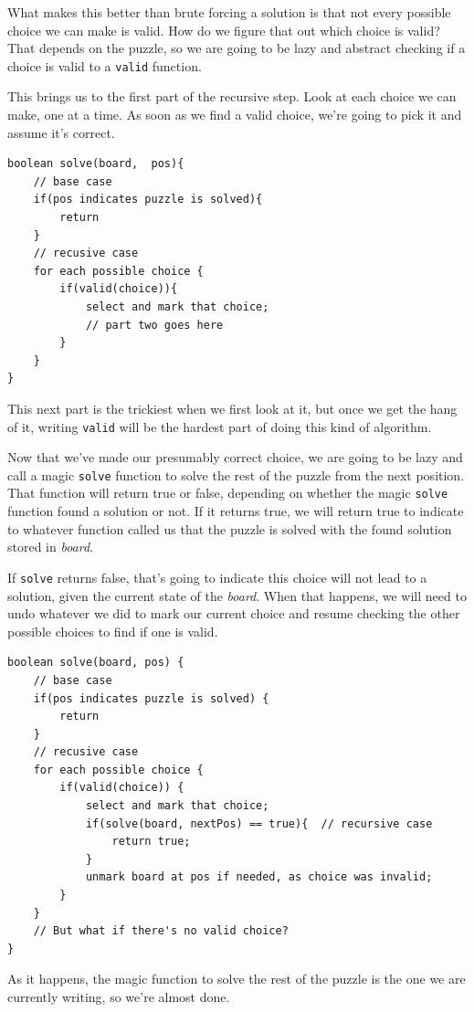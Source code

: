 What makes this better than brute forcing a solution is that not every possible choice we can make is valid. How do we figure that out which choice is valid?  That depends on the puzzle, so we are going to be lazy and abstract checking if a choice is valid to a \texttt{valid} function.

This brings us to the first part of the recursive step. Look at each choice we can make, one at a time.  As soon as we find a valid choice, we're going to pick it and assume it's correct.

\begin{verbatim}
boolean solve(board,  pos){
	// base case
	if(pos indicates puzzle is solved){
		return
	}
	// recusive case
	for each possible choice {
		if(valid(choice)){
			select and mark that choice;
			// part two goes here
		}
	}
}
\end{verbatim}


This next part is the trickiest when we first look at it, but once we get the hang of it, writing \texttt{valid} will be the hardest part of doing this kind of algorithm.

Now that we've made our presumably correct choice, we are going to be lazy and call a magic \texttt{solve} function to solve the rest of the puzzle from the next position.  That function will return true or false, depending on whether the magic \texttt{solve} function found a solution or not.  If it returns true, we will return true to indicate to whatever function called us that the puzzle is solved with the found solution stored in \textit{board}.

If \texttt{solve} returns false, that's going to indicate this choice will not lead to a solution, given the current state of the \textit{board}.  When that happens, we will need to undo whatever we did to mark our current choice and resume checking the other possible choices to find if one is valid.


\begin{verbatim}
boolean solve(board, pos) {
	// base case
	if(pos indicates puzzle is solved) {
		return
	}
	// recusive case
	for each possible choice {
		if(valid(choice)) {
			select and mark that choice;
			if(solve(board, nextPos) == true){  // recursive case
				return true;
			}
			unmark board at pos if needed, as choice was invalid;
		}
	}
	// But what if there's no valid choice?
}
\end{verbatim}


As it happens, the magic function to solve the rest of the puzzle is the one we are currently writing, so we're almost done.

